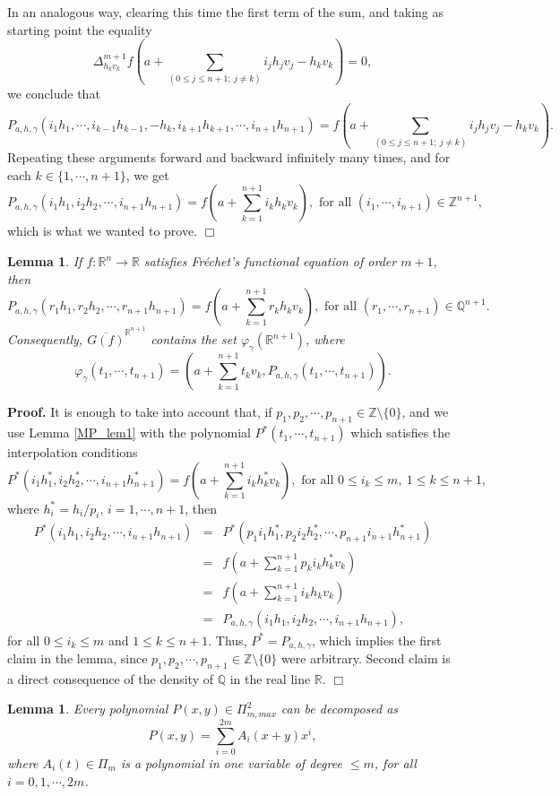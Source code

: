 \documentclass[10pt,a4paper]{amsart}
\newtheorem{lemma}[theorem]{Lemma}
\theoremstyle{definition}
\begin{document}
In an analogous way, clearing this time the first term of the sum, and taking as starting point the equality 
\[
 \Delta_{h_kv_k}^{m+1}f(a+\sum_{(0\leq j\leq n+1;\ j\neq k)} i_jh_jv_j-h_kv_k)=0, 
\] 
we conclude that 
\[
 P_{a,h,\gamma}(i_1h_1,\cdots, i_{k-1}h_{k-1},-h_k,i_{k+1}h_{k+1}, \cdots,i_{n+1}h_{n+1}) = f(a+\sum_{(0\leq j\leq n+1;\ j\neq k)} i_jh_jv_j- h_kv_k).
\]
Repeating these arguments forward and backward infinitely many times, and for each  $k\in\{1,\cdots,n+1\}$, we get  
\[
P_{a,h,\gamma}(i_1h_1,i_2h_2,\cdots,i_{n+1}h_{n+1})=f(a+\sum_{k=1}^{n+1}i_kh_kv_k), \text{ for all } (i_1,\cdots,i_{n+1})\in\mathbb{Z}^{n+1},
\] 
which is what we wanted to prove. {\hfill $\Box$}

\begin{lemma}\label{MP_lem2} If $f:\mathbb{R}^n\to\mathbb{R}$ satisfies Fr\'{e}chet's functional equation of order $m+1$, then 
\[
P_{a,h,\gamma}(r_1h_1,r_2h_2,\cdots,r_{n+1}h_{n+1})=f(a+\sum_{k=1}^{n+1}r_kh_kv_k), \text{ for all } (r_1,\cdots,r_{n+1})\in\mathbb{Q}^{n+1}.
\]
Consequently, $\overline{G(f)}^{\mathbb{R}^{n+1}}$ contains the set $\varphi_{\gamma}(\mathbb{R}^{n+1})$, where 
\[
\varphi_{\gamma}(t_1,\cdots,t_{n+1})=(a+\sum_{k=1}^{n+1}t_kv_k,P_{a,h,\gamma}(t_1,\cdots,t_{n+1})). 
\]
\end{lemma}
\noindent \textbf{Proof. } It is enough to take into account that, if $p_1,p_2,\cdots,p_{n+1}\in \mathbb{Z}\setminus\{0\}$, and we use Lemma \ref{MP_lem1}  with the polynomial $P^*(t_1,\cdots,t_{n+1})$ which satisfies the interpolation conditions 
\[
P^*(i_1h_1^*,i_2h_2^*,\cdots,i_{n+1}h_{n+1}^*)=f(a+\sum_{k=1}^{n+1}i_kh_k^*v_k), \text{ for all } 0\leq i_k\leq m,\ 1\leq k\leq n+1,
\] 
where $h_i^*=h_i/p_i$, $i=1,\cdots,n+1$, then 
\begin{eqnarray*}
P^*(i_1h_1,i_2h_2,\cdots,i_{n+1}h_{n+1}) &=& P^*(p_1i_1h_1^*,p_2i_2h_2^*,\cdots,p_{n+1}i_{n+1}h_{n+1}^*) \\
&=& f(a+\sum_{k=1}^{n+1}p_ki_kh_k^*v_k)\\ 
&=& f(a+\sum_{k=1}^{n+1}i_kh_kv_k)\\
&=& P_{a,h,\gamma}(i_1h_1,i_2h_2,\cdots,i_{n+1}h_{n+1}), 
\end{eqnarray*} 
for all  $0\leq i_k\leq m$ and $1\leq k\leq n+1$. Thus, $P^*=P_{a,h,\gamma}$, which implies the first claim in the lemma, since  $p_1,p_2,\cdots,p_{n+1}\in \mathbb{Z}\setminus\{0\}$ were arbitrary. Second claim is a direct consequence of the density of $\mathbb{Q}$ in the real line $\mathbb{R}$.  {\hfill $\Box$}

\begin{lemma}\label{lema2}
Every polynomial $P(x,y)\in\Pi_{m,max}^2$ can be decomposed as
$$P(x,y)=\sum_{i=0}^{2m}A_i(x+y)x^i,$$
where $A_i(t)\in \Pi_m$ is a  polynomial in one variable of degree $\leq m$, for all $i=0,1,\cdots, 2m$.
\end{lemma}
\end{document}
